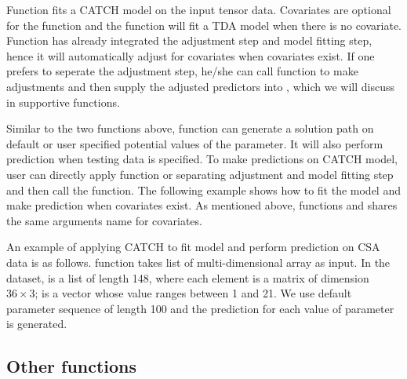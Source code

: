 Function  fits a CATCH model on the input tensor data. Covariates are optional for the function and the function will fit a TDA model when there is no covariate. Function  has already integrated the adjustment step and model fitting step, hence it will automatically adjust for covariates when covariates exist. If one prefers to seperate the adjustment step, he/she can call  function to make adjustments and then supply the adjusted predictors into , which we will discuss in supportive functions.

Similar to the two functions above, function  can generate a solution path on default or user specified potential values of the parameter. It will also perform prediction when testing data is specified. To make predictions on CATCH model, user can directly apply  function or separating adjustment and model fitting step and then call the  function. The following example shows how to fit the model and make prediction when covariates exist. As mentioned above, functions  and  shares the same arguments name for covariates.

An example of applying CATCH to fit model and perform prediction on CSA data is as follows.  function takes list of multi-dimensional array as input. In the dataset,  is a list of length 148, where each element is a matrix of dimension $36\times 3$;  is a vector whose value ranges between 1 and 21. We use default parameter sequence of length 100 and the prediction for each value of parameter is generated.


  
  
  
  
  
  
  \subsection{Other functions}\label{Sec:otherfun}
  
